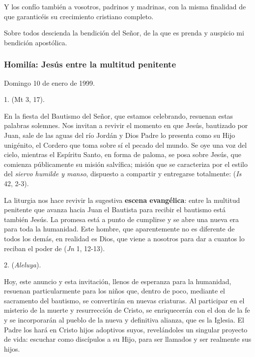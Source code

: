 {Y los confío también a vosotros, padrinos y madrinas, con la misma finalidad de que garanticéis su crecimiento cristiano completo.

Sobre todos descienda la bendición del Señor, de la que es prenda y auspicio mi bendición apostólica.

\subsubsection{Homilía: Jesús entre la multitud penitente}

Domingo 10 de enero de 1999.

1.  (Mt 3, 17).

En la fiesta del Bautismo del Señor, que estamos celebrando, resuenan estas palabras solemnes. Nos invitan a revivir el momento en que Jesús, bautizado por Juan, sale de las aguas del río Jordán y Dios Padre lo presenta como su Hijo unigénito, el Cordero que toma sobre sí el pecado del mundo. Se oye una voz del cielo, mientras el Espíritu Santo, en forma de paloma, se posa sobre Jesús, que comienza públicamente su misión salvífica; misión que se caracteriza por el estilo del \emph{siervo humilde y manso}, dispuesto a compartir y entregarse totalmente:  (\emph{Is} 42, 2-3).

La liturgia nos hace revivir la sugestiva \textbf{escena evangélica}: entre la multitud penitente que avanza hacia Juan el Bautista para recibir el bautismo está también Jesús. La promesa está a punto de cumplirse y se abre una nueva era para toda la humanidad. Este hombre, que aparentemente no es diferente de todos los demás, en realidad es Dios, que viene a nosotros para dar a cuantos lo reciban el poder de  (\emph{Jn} 1, 12-13).

2.  (\emph{Aleluya}).

Hoy, este anuncio y esta invitación, llenos de esperanza para la humanidad, resuenan particularmente para los niños que, dentro de poco, mediante el sacramento del bautismo, se convertirán en nuevas criaturas. Al participar en el misterio de la muerte y resurrección de Cristo, se enriquecerán con el don de la fe y se incorporarán al pueblo de la nueva y definitiva alianza, que es la Iglesia. El Padre los hará en Cristo hijos adoptivos suyos, revelándoles un singular proyecto de vida: escuchar como discípulos a su Hijo, para ser llamados y ser realmente sus hijos.

}

